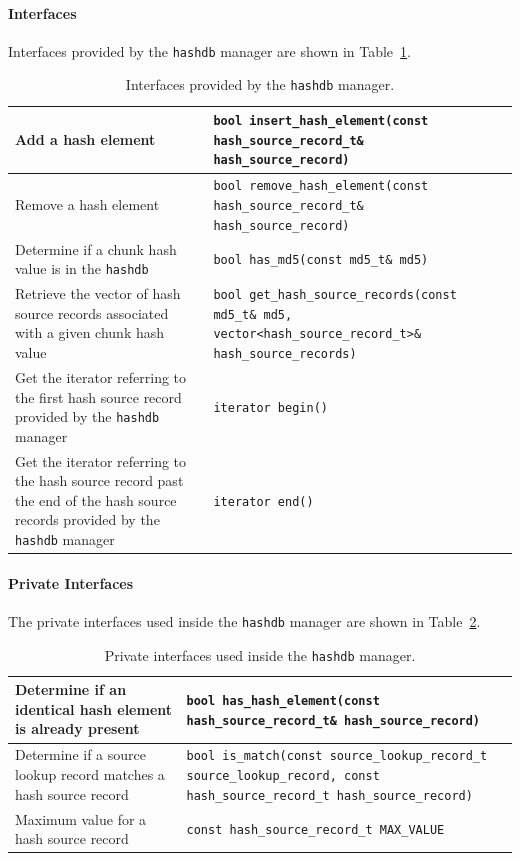 \documentclass[10pt,twoside]{article}
\newcommand{\hdb}{\texttt{hashdb}\xspace}
\begin{document}
\paragraph{Interfaces}
Interfaces provided by the \hdb manager are shown in Table~\ref{hashdb-manager-interfaces}.
\begin{table}[h]
\center
\begin{tabular}{|p{2in}|p{4in}|}
\hline
Add a hash element & \texttt{bool insert\_hash\_element(const hash\_source\_record\_t\& hash\_source\_record)} \\
\hline
Remove a hash element & \texttt{bool remove\_hash\_element(const hash\_source\_record\_t\& hash\_source\_record)} \\
\hline
Determine if a chunk hash value is in the \hdb & \texttt{bool has\_md5(const md5\_t\& md5)} \\
\hline
Retrieve the vector of hash source records associated with a given chunk hash value & \texttt{bool get\_hash\_source\_records(const md5\_t\& md5, vector\textless hash\_source\_record\_t\textgreater\& hash\_source\_records)} \\
\hline
Get the iterator referring to the first hash source record provided by the \hdb manager & \texttt{iterator begin()} \\
\hline
Get the iterator referring to the hash source record past the end of the hash source records provided by the \hdb manager & \texttt{iterator end()} \\
\hline
\end{tabular}
\caption{Interfaces provided by the \hdb manager.\label{hashdb-manager-interfaces}}
\end{table}

\paragraph{Private Interfaces}
The private interfaces used inside the \hdb manager
are shown in Table~\ref{hashdb-manager-private-interfaces}.
\begin{table}[h]
\center
\begin{tabular}{|p{2in}|p{4in}|}
\hline
Determine if an identical hash element is already present & \texttt{bool has\_hash\_element(const hash\_source\_record\_t\& hash\_source\_record)} \\
\hline
Determine if a source lookup record matches a hash source record & \texttt{bool is\_match(const source\_lookup\_record\_t source\_lookup\_record, const hash\_source\_record\_t hash\_source\_record)} \\
\hline
Maximum value for a hash source record & \texttt{const hash\_source\_record\_t MAX\_VALUE} \\
\hline
\end{tabular}
\caption{Private interfaces used inside the \hdb manager.\label{hashdb-manager-private-interfaces}}
\end{table}
\end{document}
